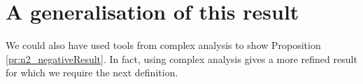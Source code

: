
\section{A generalisation of this result}

We could also have used tools from complex analysis to show Proposition \ref{pr:n2_negativeResult}.
In fact, using complex analysis \cite{Alessandrini1992} gives a more refined result
for which we require the next definition.

